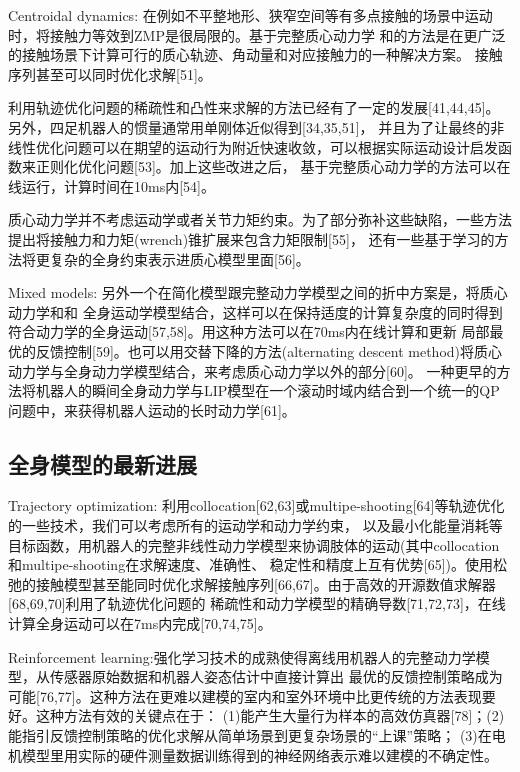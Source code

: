 Centroidal dynamics: 在例如不平整地形、狭窄空间等有多点接触的场景中运动时，将接触力等效到ZMP是很局限的。基于完整质心动力学
和的方法是在更广泛的接触场景下计算可行的质心轨迹、角动量和对应接触力的一种解决方案。
接触序列甚至可以同时优化求解[51]。

利用轨迹优化问题的稀疏性和凸性来求解的方法已经有了一定的发展[41,44,45]。另外，四足机器人的惯量通常用单刚体近似得到[34,35,51]，
并且为了让最终的非线性优化问题可以在期望的运动行为附近快速收敛，可以根据实际运动设计启发函数来正则化优化问题[53]。加上这些改进之后，
基于完整质心动力学的方法可以在线运行，计算时间在10ms内[54]。

质心动力学并不考虑运动学或者关节力矩约束。为了部分弥补这些缺陷，一些方法提出将接触力和力矩(wrench)锥扩展来包含力矩限制[55]，
还有一些基于学习的方法将更复杂的全身约束表示进质心模型里面[56]。

Mixed models: 另外一个在简化模型跟完整动力学模型之间的折中方案是，将质心动力学和和
全身运动学模型结合，这样可以在保持适度的计算复杂度的同时得到符合动力学的全身运动[57,58]。用这种方法可以在70ms内在线计算和更新
局部最优的反馈控制[59]。也可以用交替下降的方法(alternating descent method)将质心动力学与全身动力学模型结合，来考虑质心动力学以外的部分[60]。
一种更早的方法将机器人的瞬间全身动力学与LIP模型在一个滚动时域内结合到一个统一的QP问题中，来获得机器人运动的长时动力学[61]。

\subsection{全身模型的最新进展}
Trajectory optimization: 利用collocation[62,63]或multipe-shooting[64]等轨迹优化的一些技术，我们可以考虑所有的运动学和动力学约束，
以及最小化能量消耗等目标函数，用机器人的完整非线性动力学模型来协调肢体的运动(其中collocation和multipe-shooting在求解速度、准确性、
稳定性和精度上互有优势[65])。使用松弛的接触模型甚至能同时优化求解接触序列[66,67]。由于高效的开源数值求解器[68,69,70]利用了轨迹优化问题的
稀疏性和动力学模型的精确导数[71,72,73]，在线计算全身运动可以在7ms内完成[70,74,75]。

Reinforcement learning:强化学习技术的成熟使得离线用机器人的完整动力学模型，从传感器原始数据和机器人姿态估计中直接计算出
最优的反馈控制策略成为可能[76,77]。这种方法在更难以建模的室内和室外环境中比更传统的方法表现要好。这种方法有效的关键点在于：
(1)能产生大量行为样本的高效仿真器[78]；(2)能指引反馈控制策略的优化求解从简单场景到更复杂场景的“上课”策略；
(3)在电机模型里用实际的硬件测量数据训练得到的神经网络表示难以建模的不确定性。

